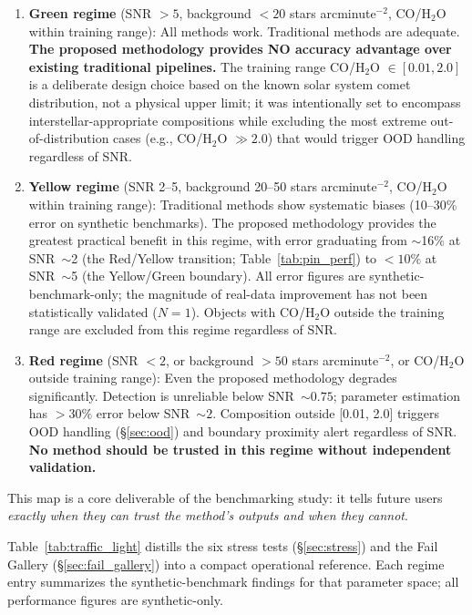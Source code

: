 \documentclass[usenatbib]{mnras}
\begin{document}
\begin{enumerate}
    \item \textbf{Green regime} (SNR $>5$, background $<20$ stars arcminute$^{-2}$, CO/H$_2$O within training range): All methods work. Traditional methods are adequate. \textbf{The proposed methodology provides NO accuracy advantage over existing traditional pipelines.} The training range CO/H$_2$O $\in [0.01, 2.0]$ is a deliberate design choice based on the known solar system comet distribution, not a physical upper limit; it was intentionally set to encompass interstellar-appropriate compositions while excluding the most extreme out-of-distribution cases (e.g., CO/H$_2$O $\gg 2.0$) that would trigger OOD handling regardless of SNR.
    \item \textbf{Yellow regime} (SNR 2--5, background 20--50 stars arcminute$^{-2}$, CO/H$_2$O within training range): Traditional methods show systematic biases (10--30\% error on synthetic benchmarks). The proposed methodology provides the greatest practical benefit in this regime, with error graduating from $\sim$16\% at SNR~$\sim$2 (the Red/Yellow transition; Table~\ref{tab:pin_perf}) to $<10\%$ at SNR~$\sim$5 (the Yellow/Green boundary). All error figures are synthetic-benchmark-only; the magnitude of real-data improvement has not been statistically validated ($N=1$). Objects with CO/H$_2$O outside the training range are excluded from this regime regardless of SNR.
    \item \textbf{Red regime} (SNR $<2$, or background $>50$ stars arcminute$^{-2}$, or CO/H$_2$O outside training range): Even the proposed methodology degrades significantly. Detection is unreliable below SNR~$\sim 0.75$; parameter estimation has $>30\%$ error below SNR~$\sim 2$. Composition outside [0.01, 2.0] triggers OOD handling (\S\ref{sec:ood}) and boundary proximity alert regardless of SNR. \textbf{No method should be trusted in this regime without independent validation.}
\end{enumerate}

This map is a core deliverable of the benchmarking study: it tells future users \textit{exactly when they can trust the method's outputs and when they cannot}.

Table~\ref{tab:traffic_light} distills the six stress tests (\S\ref{sec:stress}) and the Fail Gallery (\S\ref{sec:fail_gallery}) into a compact operational reference. Each regime entry summarizes the synthetic-benchmark findings for that parameter space; all performance figures are synthetic-only.
\end{document}
